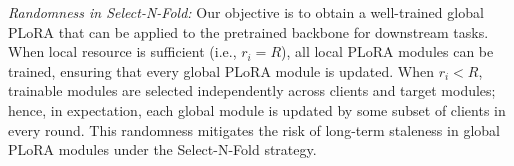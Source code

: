 \documentclass{article} %
\newcommand{\supplement}[1]{\textit{#1}}
\begin{document}
\textit{Randomness in Select-N-Fold:} Our objective is to obtain a well-trained global PLoRA that can be applied to the pretrained backbone for downstream tasks. When local resource is sufficient (i.e., $r_i = R$), all local PLoRA modules can be trained, ensuring that every global PLoRA module is updated. When $r_i < R$, trainable modules are selected independently across clients and target modules; hence, in expectation, each global module is updated by some subset of clients in every round. This randomness mitigates the risk of long-term staleness in global PLoRA modules under the Select-N-Fold strategy. %


 
\end{document}
